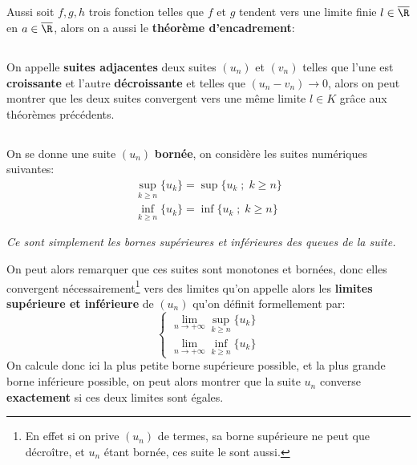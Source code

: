 \subsection*{}
Aussi soit \(f, g, h\) trois fonction telles que \(f\) et \(g\) tendent vers une limite finie \(l \in \overline{\R}\) en \(a \in \overline{\R}\), alors on a aussi le \textbf{théorème d'encadrement}:
\subsection*{}
On appelle \textbf{suites adjacentes} deux suites \((u_n)\) et \((v_n)\) telles que l'une est \textbf{croissante} et l'autre \textbf{décroissante} et telles que \((u_n - v_n) \rightarrow 0\), alors on peut montrer que les deux suites convergent vers une même limite \(l \in K\) grâce aux théorèmes précédents.
\subsection*{}
On se donne une suite \((u_n)\) \textbf{bornée}, on considère les suites numériques suivantes:
\begin{align*}
   \sup_{k \geq n}\{ u_k \} = \sup\{ u_k \; ; \; k \geq n\}\\
   \inf_{k \geq n}\{ u_k \} = \inf\{ u_k \; ; \; k \geq n\}
\end{align*}
\begin{center}
    \textit{
      Ce sont simplement les bornes supérieures et inférieures des queues de la suite. 
    }
\end{center}
On peut alors remarquer que ces suites sont monotones et bornées, donc elles convergent nécessairement\footnote[1]{En effet si on prive \((u_n)\) de termes, sa borne supérieure ne peut que décroître, et \(u_n\) étant bornée, ces suite le sont aussi.} vers des limites qu'on appelle alors les \textbf{limites supérieure et inférieure} de \((u_n)\) qu'on définit formellement par:
\[
   \begin{cases}
      \lim_{n \rightarrow +\infty}\sup_{k \geq n}\{ u_k \}\\
      \lim_{n \rightarrow +\infty}\inf_{k \geq n}\{ u_k \}
   \end{cases}
\]
On calcule donc ici la plus petite borne supérieure possible, et la plus grande borne inférieure possible, on peut alors montrer que la suite \(u_n\) converse \textbf{exactement} si ces deux limites sont égales.

